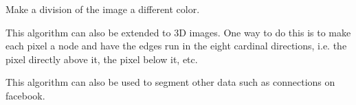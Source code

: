 \begin{problem}
Make a division of the image a different color.
\end{problem}

This algorithm can also be extended to 3D images.
One way to do this is to make each pixel a node and have the edges run in the eight cardinal directions, i.e. the pixel directly above it, the pixel below it, etc.

This algorithm can also be used to segment other data such as connections on facebook. 
